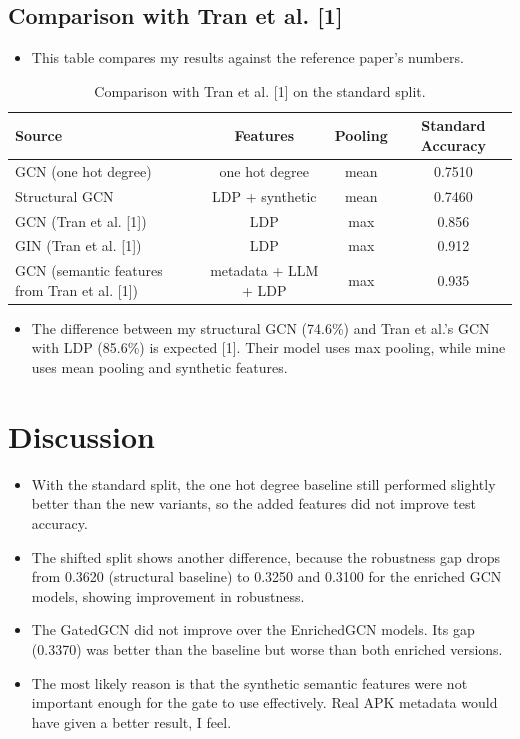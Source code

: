 \documentclass[12pt]{article}
\begin{document}
\subsection{Comparison with Tran et al. [1]}

\begin{itemize}
    \item This table compares my results against the reference paper's numbers.
\end{itemize}

\begin{table}[h]
\centering
\begin{tabular}{lccc}
\hline
\textbf{Source} & \textbf{Features} & \textbf{Pooling} & \textbf{Standard Accuracy} \\
\hline
GCN (one hot degree) & one hot degree & mean & 0.7510 \\
Structural GCN & LDP + synthetic & mean & 0.7460 \\
GCN (Tran et al. [1]) & LDP & max & 0.856 \\
GIN (Tran et al. [1]) & LDP & max & 0.912 \\
GCN (semantic features from Tran et al. [1]) & metadata + LLM + LDP & max & 0.935 \\
\hline
\end{tabular}
\caption{Comparison with Tran et al. [1] on the standard split.}
\label{tab:tran_compare}
\end{table}

\begin{itemize}
    \item The difference between my structural GCN (74.6\%) and Tran et al.'s GCN with LDP (85.6\%) is expected [1]. Their model uses max pooling, while mine uses mean pooling and synthetic features. 
\end{itemize}

\section{Discussion}

\begin{itemize}
    \item With the standard split, the one hot degree baseline still performed slightly better than the new variants, so the added features did not improve test accuracy. 
    \item The shifted split shows another difference, because the robustness gap drops from 0.3620 (structural baseline) to 0.3250 and 0.3100 for the enriched GCN models, showing improvement in robustness. 
    \item The GatedGCN did not improve over the EnrichedGCN models. Its gap (0.3370) was better than the baseline but worse than both enriched versions. 
    \item The most likely reason is that the synthetic semantic features were not important enough for the gate to use effectively. Real APK metadata would have given a better result, I feel. 
\end{itemize}
\end{document}

